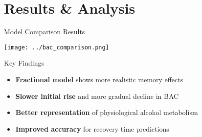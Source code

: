 \documentclass[aspectratio=169]{beamer}
\newcommand{\highlight}[1]{\textcolor{kentech_orange}{\textbf{#1}}}
\begin{document}
\section{Results \& Analysis}

\begin{frame}{Model Comparison Results}
    \begin{center}
        \texttt{[image: ../bac\_comparison.png]}
    \end{center}
    
    \begin{block}{Key Findings}
        \begin{itemize}
            \item \highlight{Fractional model} shows more realistic memory effects
            \item \highlight{Slower initial rise} and more gradual decline in BAC
            \item \highlight{Better representation} of physiological alcohol metabolism
            \item \highlight{Improved accuracy} for recovery time predictions
        \end{itemize}
    \end{block}
\end{frame}
\end{document}

